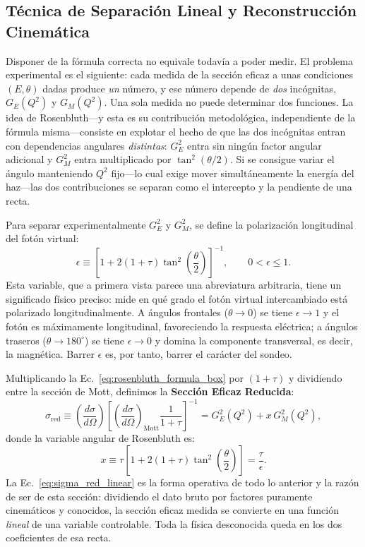 \documentclass[10pt,a4paper]{article}
\begin{document}
\subsection{Técnica de Separación Lineal y Reconstrucción Cinemática}
Disponer de la fórmula correcta no equivale todavía a poder medir. El problema experimental es el siguiente: cada medida de la sección eficaz a unas condiciones $(E,\theta)$ dadas produce \emph{un} número, y ese número depende de \emph{dos} incógnitas, $G_E(Q^2)$ y $G_M(Q^2)$. Una sola medida no puede determinar dos funciones. La idea de Rosenbluth---y esta es su contribución metodológica, independiente de la fórmula misma---consiste en explotar el hecho de que las dos incógnitas entran con dependencias angulares \emph{distintas}: $G_E^2$ entra sin ningún factor angular adicional y $G_M^2$ entra multiplicado por $\tan^2(\theta/2)$. Si se consigue variar el ángulo manteniendo $Q^2$ fijo---lo cual exige mover simultáneamente la energía del haz---las dos contribuciones se separan como el intercepto y la pendiente de una recta.

Para separar experimentalmente $G_E^2$ y $G_M^2$, se define la polarización longitudinal del fotón virtual:
\begin{equation}
\epsilon \equiv \left[ 1 + 2(1+\tau)\tan^2\left(\frac{\theta}{2}\right) \right]^{-1}, \qquad 0 < \epsilon \le 1.
\end{equation}
Esta variable, que a primera vista parece una abreviatura arbitraria, tiene un significado físico preciso: mide en qué grado el fotón virtual intercambiado está polarizado longitudinalmente. A ángulos frontales ($\theta \to 0$) se tiene $\epsilon \to 1$ y el fotón es máximamente longitudinal, favoreciendo la respuesta eléctrica; a ángulos traseros ($\theta \to 180^\circ$) se tiene $\epsilon \to 0$ y domina la componente transversal, es decir, la magnética. Barrer $\epsilon$ es, por tanto, barrer el carácter del sondeo.

Multiplicando la Ec.~\eqref{eq:rosenbluth_formula_box} por $(1+\tau)$ y dividiendo entre la sección de Mott, definimos la \textbf{Sección Eficaz Reducida}:
\begin{equation}
\boxed{\sigma_{\text{red}} \equiv \left( \frac{d\sigma}{d\Omega} \right) \left[ \left( \frac{d\sigma}{d\Omega} \right)_{\text{Mott}} \frac{1}{1+\tau} \right]^{-1} = G_E^2(Q^2) + x \, G_M^2(Q^2)},
\label{eq:sigma_red_linear}
\end{equation}
donde la variable angular de Rosenbluth es:
\begin{equation}
x \equiv \tau \left[ 1 + 2(1+\tau)\tan^2\left(\frac{\theta}{2}\right) \right] = \frac{\tau}{\epsilon}.
\end{equation}
La Ec.~\eqref{eq:sigma_red_linear} es la forma operativa de todo lo anterior y la razón de ser de esta sección: dividiendo el dato bruto por factores puramente cinemáticos y conocidos, la sección eficaz medida se convierte en una función \emph{lineal} de una variable controlable. Toda la física desconocida queda en los dos coeficientes de esa recta.
\end{document}
